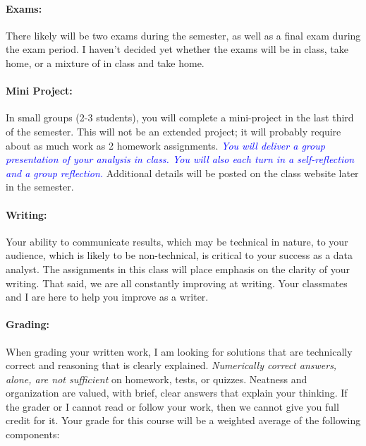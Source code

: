 \documentclass[12pt,a4paper]{article}
\begin{document}
\paragraph{Exams:} There likely will be two exams during the semester, as well as a final exam during the exam period. I haven't decided yet whether the exams will be in class, take home, or a mixture of in class and take home. 

\paragraph{Mini Project:} In small groups (2-3 students), you will complete a mini-project in the last third of the semester. This will not be an extended project; it will probably require about as much work as 2 homework assignments.  \textcolor{blue}{\emph{You will deliver a group presentation of your analysis in class. You will also each turn in a self-reflection and a group reflection.}} Additional details will be posted on the class website later in the semester.


\paragraph{Writing:} Your ability to communicate results, which may be technical in nature, to your audience, which is likely to be non-technical, is critical to your success as a data analyst. The assignments in this class will place emphasis on the clarity of your writing. That said, we are all constantly improving at writing. Your classmates and I are here to help you improve as a writer.


\paragraph{Grading:} When grading your written work, I am looking for solutions that are technically correct and reasoning that is clearly explained. \emph{Numerically correct answers, alone, are not sufficient} on homework, tests, or quizzes. Neatness and organization are valued, with brief, clear answers that explain your thinking. If the grader or I cannot read or follow your work, then we cannot give you full credit for it. Your grade for this course will be a weighted average of the following components:
\end{document}
